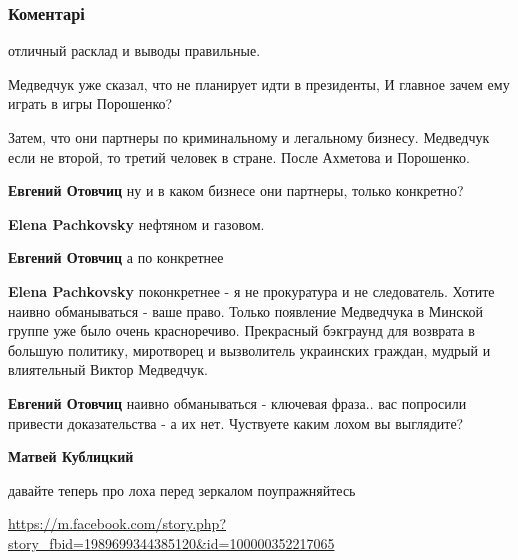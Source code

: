  
 
 
 
 
\subsubsection{Коментарі}
\label{sec:05_09_2018.fb.lesev_igor.1.o_medvedchuke.cmt}

\begin{itemize} %
отличный расклад и выводы правильные.

Медведчук уже сказал, что не планирует идти в президенты, И главное зачем ему играть в игры Порошенко?

\begin{itemize} %
Затем, что они партнеры по криминальному и легальному бизнесу. Медведчук если не второй, то третий человек в стране. После Ахметова и Порошенко.

\textbf{Евгений Отовчиц} ну и в каком бизнесе они партнеры, только конкретно?

\textbf{Elena Pachkovsky} нефтяном и газовом.

\textbf{Евгений Отовчиц} а по конкретнее

\textbf{Elena Pachkovsky} поконкретнее - я не прокуратура и не следователь. Хотите наивно обманываться - ваше право. Только появление Медведчука в Минской группе уже было очень красноречиво. Прекрасный бэкграунд для возврата в большую политику, миротворец и вызволитель украинских граждан, мудрый и влиятельный Виктор Медведчук.

\textbf{Евгений Отовчиц} наивно обманываться - ключевая фраза.. вас попросили привести доказательства - а их нет. Чуствуете каким лохом вы выглядите?

\textbf{Матвей Кублицкий} 

давайте теперь про лоха перед зеркалом поупражняйтесь

\url{https://m.facebook.com/story.php?story_fbid=1989699344385120&id=100000352217065}
\end{itemize} %


\end{itemize}
